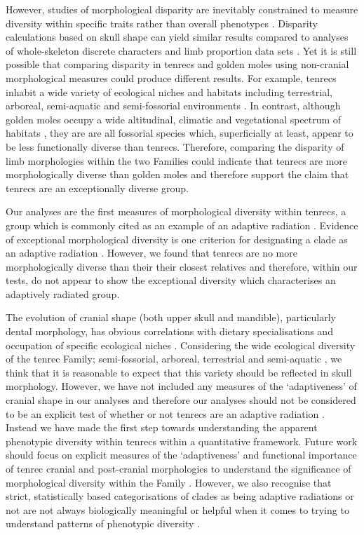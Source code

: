 \documentclass[12pt,a4paper]{article}
\begin{document}
	However, studies of morphological disparity are inevitably constrained to measure diversity within specific traits rather than overall phenotypes \citep{Roy1997}. Disparity calculations based on skull shape can yield similar results compared to analyses of whole-skeleton discrete characters and limb proportion data sets \citep{Foth2012}. Yet it is still possible that comparing disparity in tenrecs and golden moles using non-cranial morphological measures could produce different results. For example, tenrecs inhabit a wide variety of ecological niches and habitats including terrestrial, arboreal, semi-aquatic and semi-fossorial environments \citep{Soarimalala2011}. In contrast, although golden moles occupy a wide altitudinal, climatic and vegetational spectrum of habitats \citep{Bronner1995}, they are are all fossorial species which, superficially at least, appear to be less functionally diverse than tenrecs. Therefore, comparing the disparity of limb morphologies within the two Families could indicate that tenrecs are more morphologically diverse than golden moles and therefore support the claim that tenrecs are an exceptionally diverse group. 
	
	

 	Our analyses are the first measures of morphological diversity within tenrecs, a group which is commonly cited as an example of an adaptive radiation \citep{Olson2013}. Evidence of exceptional morphological diversity is one criterion for designating a clade as an adaptive radiation \citep{Losos2010a}. However, we found that tenrecs are no more morphologically diverse than their their closest relatives and therefore, within our tests, do not appear to show the exceptional diversity which characterises an adaptively radiated group.   
 	
 	The evolution of cranial shape (both upper skull and mandible), particularly dental morphology, has obvious correlations with dietary specialisations and occupation of specific ecological niches \citep[e.g.][]{Wroe2007}. Considering the wide ecological diversity of the tenrec Family; semi-fossorial, arboreal, terrestrial and semi-aquatic \citep{Soarimalala2011}, we think that it is reasonable to expect that this variety should be reflected in skull morphology. However, we have not included any measures of the `adaptiveness' of cranial shape in our analyses and therefore our analyses should not be considered to be an explicit test of whether or not tenrecs are an adaptive radiation \citep{Losos2010a}. Instead we have made the first step towards understanding the apparent phenotypic diversity within tenrecs within a quantitative framework. Future work should focus on explicit measures of the `adaptiveness' and functional importance of tenrec cranial and post-cranial morphologies to understand the significance of morphological diversity within the Family \citep[e.g.][]{Mahler2010}. However, we also recognise that strict, statistically based categorisations of clades as being adaptive radiations or not are not always biologically meaningful or helpful when it comes to trying to understand patterns of phenotypic diversity \citep{Olson2009}.   
\end{document}
